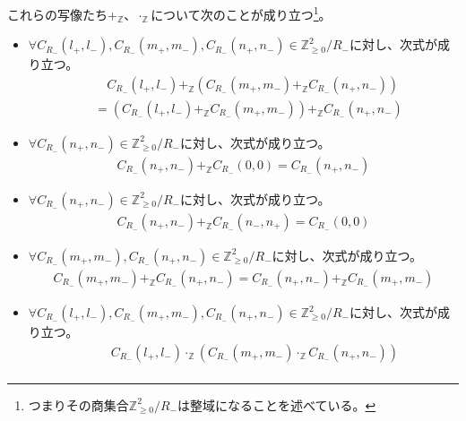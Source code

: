 \documentclass[dvipdfmx]{jsarticle}
\begin{document}
\begin{thm}\label{1.2.6.6}
これらの写像たち$+_{\mathbb{Z}}$、$\cdot_{\mathbb{Z}}$について次のことが成り立つ\footnote{つまりその商集合$\mathbb{Z}_{\geq 0}^{2} /R_{-} $は整域になることを述べている。}。
\begin{itemize}
\item
  $\forall C_{R_{-}}\left( l_{+},l_{-} \right),C_{R_{-}}\left( m_{+},m_{-} \right),C_{R_{-}}\left( n_{+},n_{-} \right) \in \mathbb{Z}_{\geq 0}^{2} /R_{-} $に対し、次式が成り立つ。
\begin{align*}
&\quad C_{R_{-}}\left( l_{+},l_{-} \right) +_{\mathbb{Z}}\left( C_{R_{-}}\left( m_{+},m_{-} \right) +_{\mathbb{Z}}C_{R_{-}}\left( n_{+},n_{-} \right) \right) \\
&= \left( C_{R_{-}}\left( l_{+},l_{-} \right) +_{\mathbb{Z}}C_{R_{-}}\left( m_{+},m_{-} \right) \right) +_{\mathbb{Z}}C_{R_{-}}\left( n_{+},n_{-} \right)
\end{align*}
\item
  $\forall C_{R_{-}}\left( n_{+},n_{-} \right) \in \mathbb{Z}_{\geq 0}^{2} /R_{-} $に対し、次式が成り立つ。
\begin{align*}
C_{R_{-}}\left( n_{+},n_{-} \right) +_{\mathbb{Z}}C_{R_{-}}(0,0) = C_{R_{-}}\left( n_{+},n_{-} \right)
\end{align*}
\item
  $\forall C_{R_{-}}\left( n_{+},n_{-} \right) \in \mathbb{Z}_{\geq 0}^{2} /R_{-} $に対し、次式が成り立つ。
\begin{align*}
C_{R_{-}}\left( n_{+},n_{-} \right) +_{\mathbb{Z}}C_{R_{-}}\left( n_{-},n_{+} \right) = C_{R_{-}}(0,0)
\end{align*}
\item
  $\forall C_{R_{-}}\left( m_{+},m_{-} \right),C_{R_{-}}\left( n_{+},n_{-} \right) \in \mathbb{Z}_{\geq 0}^{2} /R_{-} $に対し、次式が成り立つ。
\begin{align*}
C_{R_{-}}\left( m_{+},m_{-} \right) +_{\mathbb{Z}}C_{R_{-}}\left( n_{+},n_{-} \right) = C_{R_{-}}\left( n_{+},n_{-} \right) +_{\mathbb{Z}}C_{R_{-}}\left( m_{+},m_{-} \right)
\end{align*}
\item
  $\forall C_{R_{-}}\left( l_{+},l_{-} \right),C_{R_{-}}\left( m_{+},m_{-} \right),C_{R_{-}}\left( n_{+},n_{-} \right) \in \mathbb{Z}_{\geq 0}^{2} /R_{-} $に対し、次式が成り立つ。
\begin{align*}
&\quad C_{R_{-}}\left( l_{+},l_{-} \right) \cdot_{\mathbb{Z}}\left( C_{R_{-}}\left( m_{+},m_{-} \right) \cdot_{\mathbb{Z}}C_{R_{-}}\left( n_{+},n_{-} \right) \right) \\

\end{align*}
\end{itemize}
\end{thm}
\end{document}
